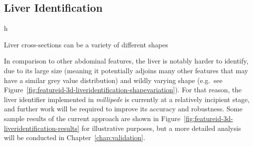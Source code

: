 \afterpage{\clearpage}
\newpage

\subsection{Liver Identification}
\label{subsec:featureid-3d-liveridentification}

\begin{stusubfig}{h}
	\hspace{4mm}%
	\hspace{4mm}%
\caption{Liver cross-sections can be a variety of different shapes}
\label{fig:featureid-3d-liveridentification-shapevariation}
\end{stusubfig}

\noindent In comparison to other abdominal features, the liver is notably harder to identify, due to its large size (meaning it potentially adjoins many other features that may have a similar grey value distribution) and wildly varying shape (e.g.~see Figure~\ref{fig:featureid-3d-liveridentification-shapevariation}). For that reason, the liver identifier implemented in \emph{millipede} is currently at a relatively incipient stage, and further work will be required to improve its accuracy and robustness. Some sample results of the current approach are shown in Figure~\ref{fig:featureid-3d-liveridentification-results} for illustrative purposes, but a more detailed analysis will be conducted in Chapter~\ref{chap:validation}.

